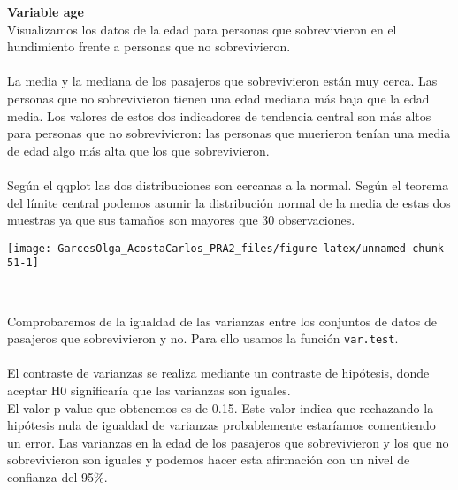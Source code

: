 \documentclass[
]{article}
\newenvironment{Shaded}{\begin{snugshade}}{\end{snugshade}}
\newcommand{\KeywordTok}[1]{\textcolor[rgb]{0.13,0.29,0.53}{\textbf{#1}}}
\newcommand{\NormalTok}[1]{#1}
\newcommand{\OperatorTok}[1]{\textcolor[rgb]{0.81,0.36,0.00}{\textbf{#1}}}
\newcommand{\StringTok}[1]{\textcolor[rgb]{0.31,0.60,0.02}{#1}}
\begin{document}
\textbf{Variable age} \texttt{}\\
Visualizamos los datos de la edad para personas que sobrevivieron en el
hundimiento frente a personas que no sobrevivieron.\\
\texttt{}~\\
La media y la mediana de los pasajeros que sobrevivieron están muy
cerca. Las personas que no sobrevivieron tienen una edad mediana más
baja que la edad media. Los valores de estos dos indicadores de
tendencia central son más altos para personas que no sobrevivieron: las
personas que muerieron tenían una media de edad algo más alta que los
que sobrevivieron.\\
\texttt{}~\\
Según el qqplot las dos distribuciones son cercanas a la normal. Según
el teorema del límite central podemos asumir la distribución normal de
la media de estas dos muestras ya que sus tamaños son mayores que 30
observaciones.\\
\texttt{}

\begin{Shaded}
\end{Shaded}

\begin{center}\texttt{[image: GarcesOlga\_AcostaCarlos\_PRA2\_files/figure-latex/unnamed-chunk-51-1]} \end{center}

\texttt{}~\\
\texttt{}

Comprobaremos de la igualdad de las varianzas entre los conjuntos de
datos de pasajeros que sobrevivieron y no. Para ello usamos la función
\texttt{var.test}.\\
\texttt{}~\\
El contraste de varianzas se realiza mediante un contraste de hipótesis,
donde aceptar H0 significaría que las varianzas son iguales. \texttt{}\\
El valor p-value que obtenemos es de 0.15. Este valor indica que
rechazando la hipótesis nula de igualdad de varianzas probablemente
estaríamos comentiendo un error. Las varianzas en la edad de los
pasajeros que sobrevivieron y los que no sobrevivieron son iguales y
podemos hacer esta afirmación con un nivel de confianza del 95\%.\\
\texttt{}
\end{document}
